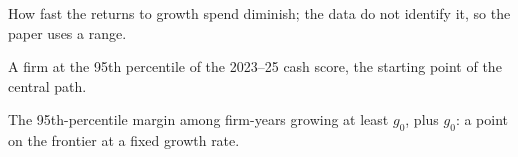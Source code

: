 {\begin{description}[leftmargin=0pt,itemsep=2pt]
\item[Spend elasticity ($\alpha$).] How fast the returns to growth spend diminish; the data do not identify it, so the paper uses a range.
\item[Top-tail firm.] A firm at the 95th percentile of the 2023--25 cash score, the starting point of the central path.
\item[$T(g_0)$.] The 95th-percentile margin among firm-years growing at least $g_0$, plus $g_0$: a point on the frontier at a fixed growth rate.
\end{description}
}
